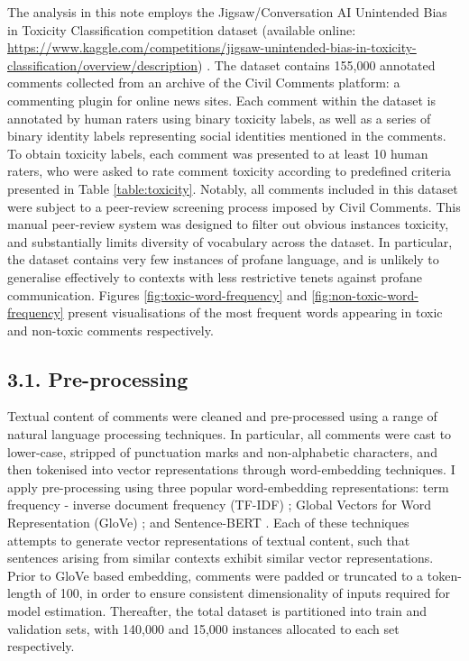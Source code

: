 
The analysis in this note employs the Jigsaw/Conversation AI Unintended Bias in Toxicity Classification competition dataset (available online: \url{https://www.kaggle.com/competitions/jigsaw-unintended-bias-in-toxicity-classification/overview/description}) \cite{JigsawDataset}. The dataset contains 155,000 annotated comments collected from an archive of the Civil Comments platform: a commenting plugin for online news sites. 
Each comment within the dataset is annotated by human raters using binary toxicity labels, as well as a series of binary identity labels representing social identities mentioned in the comments. 
To obtain toxicity labels, each comment was presented to at least 10 human raters, who were asked to rate comment toxicity according to predefined criteria presented in Table \ref{table:toxicity}. 
Notably, all comments included in this dataset were subject to a peer-review screening process imposed by Civil Comments. 
This manual peer-review system was designed to filter out obvious instances toxicity, and substantially limits diversity of vocabulary across the dataset. 
In particular, the dataset contains very few instances of profane language, and is unlikely to generalise effectively to contexts with less restrictive tenets against profane communication.
Figures \ref{fig:toxic-word-frequency} and \ref{fig:non-toxic-word-frequency} present visualisations of the most frequent words appearing in toxic and non-toxic comments respectively. 

\subsection*{3.1. Pre-processing}

Textual content of comments were cleaned and pre-processed using a range of natural language processing techniques. In particular, all comments were cast to lower-case, stripped of punctuation marks and non-alphabetic characters, and then tokenised into vector representations through word-embedding techniques. I apply pre-processing using three popular word-embedding representations: term frequency - inverse document frequency (TF-IDF) \cite{luhn1957statistical,jones1972statistical}; Global Vectors for Word Representation (GloVe) \cite{pennington2014glove}; and Sentence-BERT \cite{reimers2019sentence}. Each of these techniques attempts to generate vector representations of textual content, such that sentences arising from similar contexts exhibit similar vector representations. Prior to GloVe based embedding, comments were padded or truncated to a token-length of 100, in order to ensure consistent dimensionality of inputs required for model estimation. Thereafter, the total dataset is partitioned into train and validation sets, with 140,000 and 15,000 instances allocated to each set respectively. 


